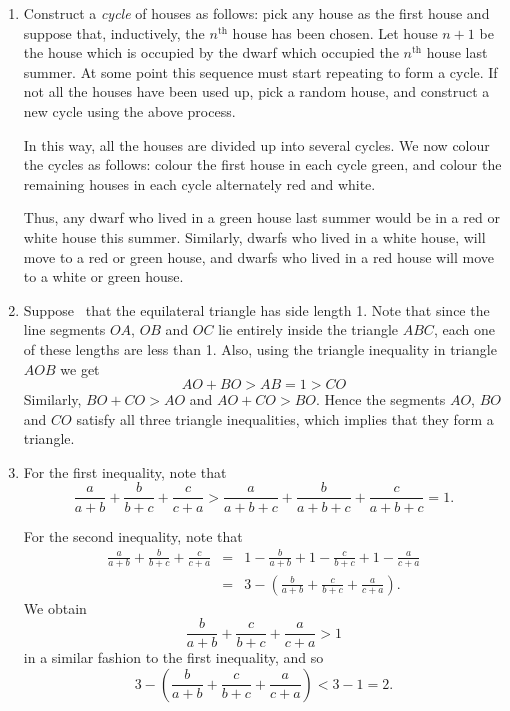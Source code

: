 \documentclass{article}
\begin{document}
\begin{enumerate}
\item Construct a \emph{cycle} of houses as follows: pick any house as the first house and suppose that, inductively, the $n^{\textrm{th}}$ house has been chosen. Let house $n+1$ be the house which is occupied by the dwarf which occupied the $n^{\textrm{th}}$ house last summer. At some point this sequence must start repeating to form a cycle. If not all the houses have been used up, pick a random house, and construct a new cycle using the above process. 

In this way, all the houses are divided up into several cycles. We now colour the cycles as follows: colour the first house in each cycle green, and colour the remaining houses in each cycle alternately red and white. 

Thus, any dwarf who lived in a green house last summer would be in a red or white house this summer. Similarly, dwarfs who lived in a white house, will move to a red or green house, and dwarfs who lived in a red house will move to a white or green house. 

\item Suppose \wlg\ that the equilateral triangle has side length 1. Note that since the line segments $OA$, $OB$ and $OC$ lie entirely inside the triangle $ABC$, each one of these lengths are less than 1. Also, using the triangle inequality in triangle $AOB$ we get 
$$AO+BO > AB = 1 > CO$$
Similarly, $BO + CO > AO$ and $AO+CO > BO$. Hence the segments $AO$, $BO$ and $CO$ satisfy all three triangle inequalities, which implies that they form a triangle. 

\item For the first inequality, note that 
$$\frac{a}{a+b} + \frac{b}{b+c} + \frac{c}{c+a} > \frac{a}{a+b+c} + \frac{b}{a+b+c}+\frac{c}{a+b+c}=1.$$

For the second inequality, note that 
\begin{eqnarray*}
\frac{a}{a+b} + \frac{b}{b+c} + \frac{c}{c+a} &=& 1-\frac{b}{a+b} + 1-\frac{c}{b+c} + 1-\frac{a}{c+a} \\
&=& 3-\left(\frac{b}{a+b} + \frac{c}{b+c} + \frac{a}{c+a}\right).
\end{eqnarray*}
We obtain 
$$\frac{b}{a+b} + \frac{c}{b+c} + \frac{a}{c+a} > 1$$ in a similar fashion to the first inequality, and so 
$$3-\left(\frac{b}{a+b} + \frac{c}{b+c} + \frac{a}{c+a}\right) < 3-1 = 2.$$

\end{enumerate}
\end{document}
